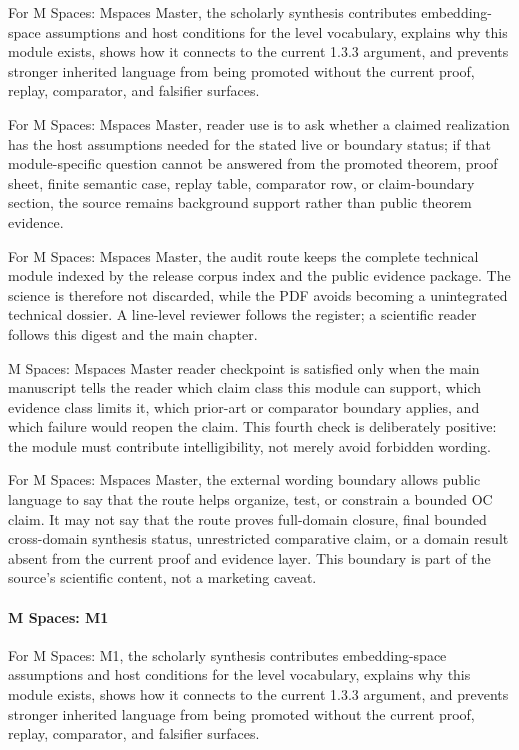 For M Spaces: Mspaces Master, the scholarly synthesis contributes embedding-space assumptions and host conditions for the level vocabulary, explains why this module exists, shows how it connects to the current 1.3.3 argument, and prevents stronger inherited language from being promoted without the current proof, replay, comparator, and falsifier surfaces.


For M Spaces: Mspaces Master, reader use is to ask whether a claimed realization has the host assumptions needed for the stated live or boundary status; if that module-specific question cannot be answered from the promoted theorem, proof sheet, finite semantic case, replay table, comparator row, or claim-boundary section, the source remains background support rather than public theorem evidence.


For M Spaces: Mspaces Master, the audit route keeps the complete technical module indexed by the release corpus index and the public evidence package. The science is therefore not discarded, while the PDF avoids becoming a unintegrated technical dossier. A line-level reviewer follows the register; a scientific reader follows this digest and the main chapter.


M Spaces: Mspaces Master reader checkpoint is satisfied only when the main manuscript tells the reader which claim class this module can support, which evidence class limits it, which prior-art or comparator boundary applies, and which failure would reopen the claim. This fourth check is deliberately positive: the module must contribute intelligibility, not merely avoid forbidden wording.


For M Spaces: Mspaces Master, the external wording boundary allows public language to say that the route helps organize, test, or constrain a bounded OC claim. It may not say that the route proves full-domain closure, final bounded cross-domain synthesis status, unrestricted comparative claim, or a domain result absent from the current proof and evidence layer. This boundary is part of the source's scientific content, not a marketing caveat.


\paragraph{M Spaces: M1}

For M Spaces: M1, the scholarly synthesis contributes embedding-space assumptions and host conditions for the level vocabulary, explains why this module exists, shows how it connects to the current 1.3.3 argument, and prevents stronger inherited language from being promoted without the current proof, replay, comparator, and falsifier surfaces.


